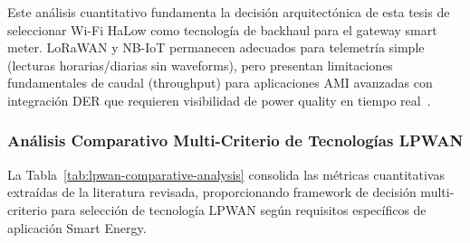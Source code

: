 Este análisis cuantitativo fundamenta la decisión arquitectónica de esta tesis de seleccionar Wi-Fi HaLow como tecnología de backhaul para el gateway smart meter. LoRaWAN y NB-IoT permanecen adecuados para telemetría simple (lecturas horarias/diarias sin waveforms), pero presentan limitaciones fundamentales de caudal (throughput) para aplicaciones AMI avanzadas con integración DER que requieren visibilidad de power quality en tiempo real~\cite{chaudhariLPWANTechnologiesEmerging2020,zhengPerformancePowerConsumption2018}.

\subsubsection{Análisis Comparativo Multi-Criterio de Tecnologías LPWAN}

La Tabla~\ref{tab:lpwan-comparative-analysis} consolida las métricas cuantitativas extraídas de la literatura revisada, proporcionando framework de decisión multi-criterio para selección de tecnología LPWAN según requisitos específicos de aplicación Smart Energy.

